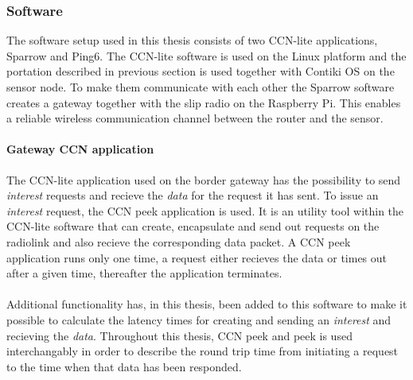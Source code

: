 \subsubsection{Software}
The software setup used in this thesis consists of two CCN-lite applications, Sparrow and Ping6. The CCN-lite software is used on the Linux platform and the portation described in previous section is used together with Contiki OS on the sensor node. To make them communicate with each other the Sparrow software creates a gateway together with the slip radio on the Raspberry Pi. This enables a reliable wireless communication channel between the router and the sensor.

\paragraph{Gateway CCN application}
The CCN-lite application used on the border gateway has the possibility to send \textit{interest} requests and recieve the \textit{data} for the request it has sent. To issue an \textit{interest} request, the CCN peek application is used. It is an utility tool within the CCN-lite software that can create, encapsulate and send out requests on the radiolink and also recieve the corresponding data packet. A CCN peek application runs only one time, a request either recieves the data or times out after a given time, thereafter the application terminates.\\\\
Additional functionality has, in this thesis, been added to this software to make it possible to calculate the latency times for creating and sending an \textit{interest} and recieving the \textit{data}. Throughout this thesis, CCN peek and peek is used interchangably in order to describe the round trip time from initiating a request to the time when that data has been responded. 

